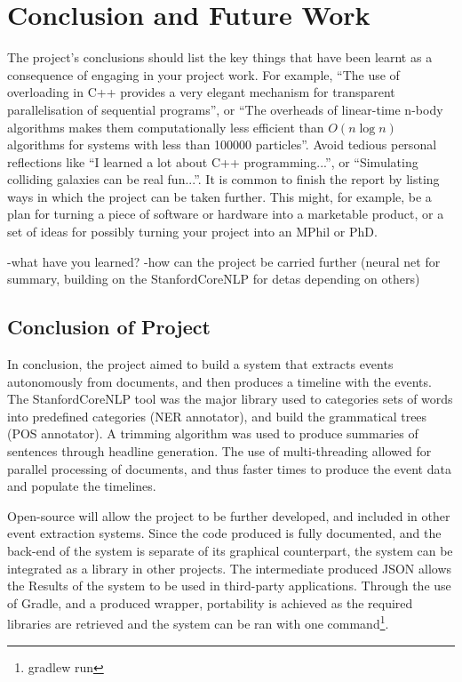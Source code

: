 \chapter{Conclusion and Future Work}

The project's conclusions should list the key things that have been learnt as a consequence of engaging in your project work. For example, ``The use of overloading in C++ provides a very elegant mechanism for transparent parallelisation of sequential programs'', or ``The overheads of linear-time n-body algorithms makes them computationally less efficient than $O(n \log n)$ algorithms for systems with less than 100000 particles''. Avoid tedious personal reflections like ``I learned a lot about C++ programming...'', or ``Simulating colliding galaxies can be real fun...''. It is common to finish the report by listing ways in which the project can be taken further. This might, for example, be a plan for turning a piece of software or hardware into a marketable product, or a set of ideas for possibly turning your project into an MPhil or PhD.

-what have you learned?
-how can the project be carried further (neural net for summary, building on the StanfordCoreNLP for detas depending on others)

\section{Conclusion of Project}
\par In conclusion, the project aimed to build a system that extracts events autonomously from documents, and then produces a timeline with the events. The StanfordCoreNLP tool was the major library used to categories sets of words into predefined categories (NER annotator), and build the grammatical trees (POS annotator). A trimming algorithm was used to produce summaries of sentences through headline generation. The use of multi-threading allowed for parallel processing of documents, and thus faster times to produce the event data and populate the timelines. 

\par Open-source will allow the project to be further developed, and included in other event extraction systems.  Since the code produced is fully documented, and the back-end of the system is separate of its graphical counterpart, the system can be integrated as a library in other projects. The intermediate produced JSON allows the Results of the system to be used in third-party applications. Through the use of Gradle, and a produced wrapper, portability is achieved as the required libraries are retrieved and the system can be ran with one command\footnote{gradlew run}. 

